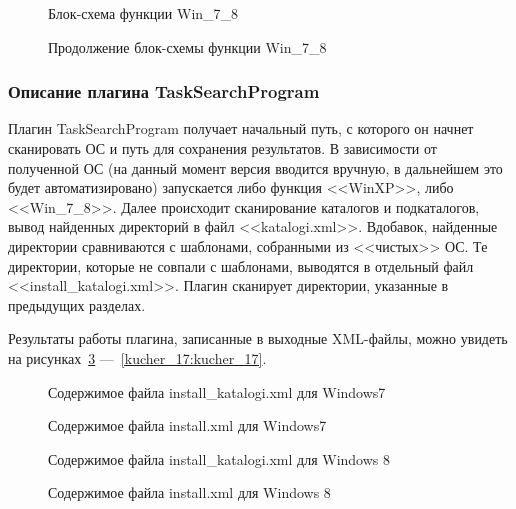 \begin{figure}[h!]
\caption{Блок-схема функции Win\_7\_8}
\label{kucher_11:kucher_11}
\end{figure}

\begin{figure}[h!]
\caption{Продолжение блок-схемы функции Win\_7\_8}
\label{kucher_18:kucher_18}
\end{figure}

\clearpage
\subsubsection{Описание плагина TaskSearchProgram}

Плагин TaskSearchProgram получает начальный путь, с которого он начнет сканировать ОС и путь для сохранения результатов. В зависимости от полученной ОС (на данный момент версия вводится вручную, в дальнейшем это будет автоматизировано) запускается либо функция <<WinXP>>, либо <<Win\_7\_8>>. Далее происходит сканирование каталогов и подкаталогов, вывод найденных директорий в файл <<katalogi.xml>>. Вдобавок, найденные директории сравниваются с шаблонами, собранными из <<чистых>> ОС. Те директории, которые не совпали с шаблонами, выводятся в отдельный файл <<install\_katalogi.xml>>. Плагин сканирует директории, указанные в предыдущих разделах.

Результаты работы плагина, записанные в выходные XML-файлы, можно увидеть на рисунках~\ref{kucher_12:kucher_12} ---~\ref{kucher_17:kucher_17}.

\begin{figure}[h!]
\caption{Содержимое файла install\_katalogi.xml для Windows7}
\label{kucher_12:kucher_12}
\end{figure}

\begin{figure}[h!]
\caption{Содержимое файла install.xml для Windows7}
\label{kucher_13:kucher_13}
\end{figure}

\begin{figure}[h!]
\caption{Содержимое файла install\_katalogi.xml для Windows 8}
\label{kucher_14:kucher_14}
\end{figure}

\begin{figure}[h!]
\caption{Содержимое файла install.xml для Windows 8}
\label{kucher_15:kucher_15}
\end{figure}


